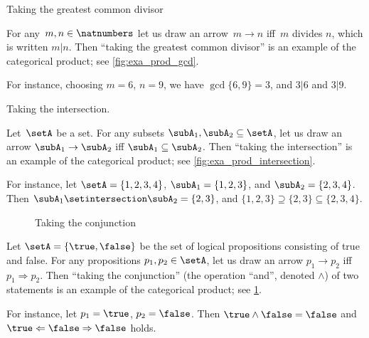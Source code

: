 \begin{marginfigure}
	\centering
	\caption{Taking the greatest common divisor}
	\label{fig:exa_prod_gcd}
\end{marginfigure}

\begin{example}
	\label{exa:gcd-as-prod}
	For any~$m, n \in \natnumbers$ let us draw an arrow~$m \to n$ iff~$m$ divides $n$, which is written $m | n$.
	Then ``taking the greatest common divisor'' is an example of the categorical product; see \cref{fig:exa_prod_gcd}.

	For instance, choosing $m = 6$, $n = 9$, we have $\gcd \{6, 9 \} = 3$, and $3 | 6$ and $3 | 9$.
\end{example}

\begin{marginfigure}
	\centering
	\caption{Taking the intersection.}
	\label{fig:exa_prod_intersection}
\end{marginfigure}

\begin{example}
	\label{exa:intersection-as-prod}
	Let~$\setA$ be a set.
	For any subsets $\subA_1, \subA_2 \subseteq \setA$, let us draw an arrow $\subA_1 \to \subA_2$ iff $\subA_1 \subseteq \subA_2$.
	Then ``taking the intersection'' is an example of the categorical product; see \cref{fig:exa_prod_intersection}.

	For instance, let $\setA = \{ 1, 2, 3, 4 \}$, $\subA_1 = \{ 1, 2, 3 \}$, and $\subA_2 = \{2, 3, 4 \}$.
	Then $\subA_1 \setintersection \subA_2 = \{2, 3 \}$, and $\{ 1, 2, 3 \} \supseteq \{2, 3 \} \subseteq \{2, 3, 4 \}$.
\end{example}

\begin{figure}
	\centering
	\caption{Taking the conjunction}
	\label{fig:exa_prod_conjunction}
\end{figure}

\begin{example}
	\label{exa:conjunction-as-prod}
	Let $\setA = \{ \true, \false \}$ be the set of logical propositions consisting of true and false.
	For any propositions $p_1, p_2  \in \setA$, let us draw an arrow $p_1 \to p_2$ iff $p_1 \Rightarrow p_2$.
	Then ``taking the conjunction'' (the operation ``and'', denoted $\wedge$) of two statements is an example of the categorical product; see \cref{fig:exa_prod_conjunction}.

	For instance, let $p_1 = \true$, $p_2 = \false$.
	Then $\true \wedge \false = \false$ and $\true \Leftarrow \false \Rightarrow \false$ holds.
\end{example}

